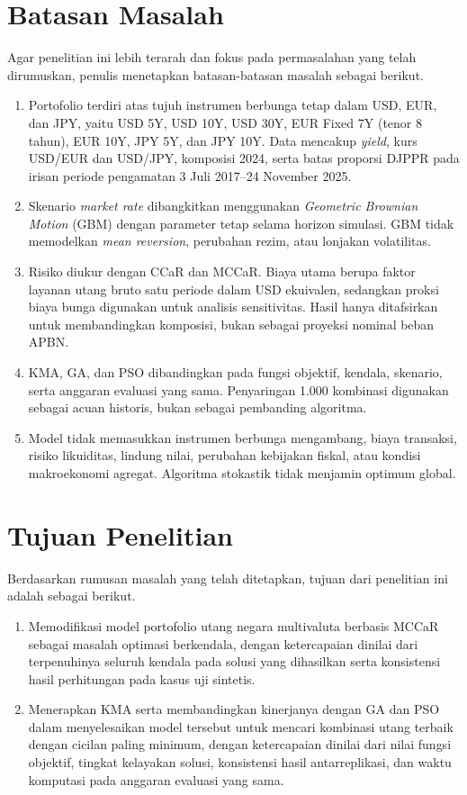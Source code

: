     \section{Batasan Masalah}\label{sec:limitation}

        Agar penelitian ini lebih terarah dan fokus pada permasalahan yang telah dirumuskan, penulis menetapkan batasan-batasan masalah sebagai berikut.
        \begin{enumerate}
            \item Portofolio terdiri atas tujuh instrumen berbunga tetap dalam USD, EUR, dan JPY, yaitu USD 5Y, USD 10Y, USD 30Y, EUR Fixed 7Y (tenor 8 tahun), EUR 10Y, JPY 5Y, dan JPY 10Y. Data mencakup \textit{yield}, kurs USD/EUR dan USD/JPY, komposisi 2024, serta batas proporsi DJPPR pada irisan periode pengamatan 3 Juli 2017--24 November 2025.
            \item Skenario \textit{market rate} dibangkitkan menggunakan \textit{Geometric Brownian Motion} (GBM) dengan parameter tetap selama horizon simulasi. GBM tidak memodelkan \textit{mean reversion}, perubahan rezim, atau lonjakan volatilitas.
            \item Risiko diukur dengan CCaR dan MCCaR. Biaya utama berupa faktor layanan utang bruto satu periode dalam USD ekuivalen, sedangkan proksi biaya bunga digunakan untuk analisis sensitivitas. Hasil hanya ditafsirkan untuk membandingkan komposisi, bukan sebagai proyeksi nominal beban APBN.
            \item KMA, GA, dan PSO dibandingkan pada fungsi objektif, kendala, skenario, serta anggaran evaluasi yang sama. Penyaringan 1.000 kombinasi digunakan sebagai acuan historis, bukan sebagai pembanding algoritma.
            \item Model tidak memasukkan instrumen berbunga mengambang, biaya transaksi, risiko likuiditas, lindung nilai, perubahan kebijakan fiskal, atau kondisi makroekonomi agregat. Algoritma stokastik tidak menjamin optimum global.
        \end{enumerate}

    \section{Tujuan Penelitian}\label{sec:purpose}

        Berdasarkan rumusan masalah yang telah ditetapkan, tujuan dari penelitian ini adalah sebagai berikut.
        \begin{enumerate}
            \item Memodifikasi model portofolio utang negara multivaluta berbasis MCCaR sebagai masalah optimasi berkendala, dengan ketercapaian dinilai dari terpenuhinya seluruh kendala pada solusi yang dihasilkan serta konsistensi hasil perhitungan pada kasus uji sintetis.
            \item Menerapkan KMA serta membandingkan kinerjanya dengan GA dan PSO dalam menyelesaikan model tersebut untuk mencari kombinasi utang terbaik dengan cicilan paling minimum, dengan ketercapaian dinilai dari nilai fungsi objektif, tingkat kelayakan solusi, konsistensi hasil antarreplikasi, dan waktu komputasi pada anggaran evaluasi yang sama.
        \end{enumerate}

